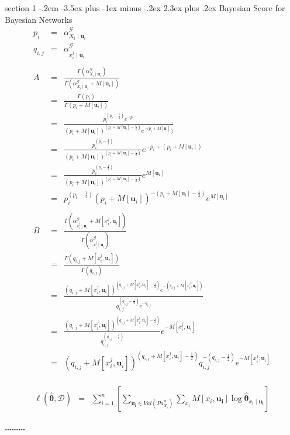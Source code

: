 \documentclass[12pt]{article}
\makeatletter
\newenvironment{problem}{\@startsection
       {section}
       {1}
       {-.2em}
       {-3.5ex plus -1ex minus -.2ex}
       {2.3ex plus .2ex}
       {\pagebreak[3]%
       \large\bf\noindent{Problem }
       }
       }
       {%
       \begin{center}\large\bf \ldots\ldots\ldots\end{center}}
\makeatother
\begin{document}
\begin{problem}{Bayesian Score for Bayesian Networks}
\begin{eqnarray*}
p_{i} & = & \alpha^{\mathcal{G}}_{X_{i}\mid \mathbf{u}_{i}}\\
q_{i,j} & = & \alpha^{\mathcal{G}}_{x_{i}^{j}\mid \mathbf{u}_{i}} \\
\\
A & = & \frac{\Gamma(\alpha^{\mathcal{G}}_{X_{i}\mid \mathbf{u}_{i}})}{\Gamma(\alpha^{\mathcal{G}}_{X_{i}\mid \mathbf{u}_{i}} + M[ \mathbf{u}_{i}])} \\
& = & \frac{\Gamma(p_{i})}{\Gamma(p_{i} + M[ \mathbf{u}_{i}])} \\
& = & \frac{p_{i}^{(p_{i}-\frac{1}{2})} e^{-p_{i}}}{(p_{i} + M[ \mathbf{u}_{i}])^{(p_{i} + M[ \mathbf{u}_{i}] - \frac{1}{2})}e^{-(p_{i} + M[ \mathbf{u}_{i}]})} \\
& = & \frac{p_{i}^{(p_{i}-\frac{1}{2})} }{(p_{i} + M[ \mathbf{u}_{i}])^{(p_{i} + M[ \mathbf{u}_{i}] - \frac{1}{2})}} e^{-p_{i}+(p_{i} + M[ \mathbf{u}_{i}])} \\
& = & \frac{p_{i}^{(p_{i}-\frac{1}{2})} }{(p_{i} + M[ \mathbf{u}_{i}])^{(p_{i} + M[ \mathbf{u}_{i}] - \frac{1}{2})}} e^{ M[ \mathbf{u}_{i}]} \\
& = & p_{i}^{(p_{i}-\frac{1}{2})} 
	(p_{i} + M[ \mathbf{u}_{i}])^{-(p_{i} + M[ \mathbf{u}_{i}] - \frac{1}{2})} 
	e^{ M[ \mathbf{u}_{i}]} \\
\\
B & = & \frac{\Gamma(\alpha^{\mathcal{G}}_{x_{i}^{j}\mid \mathbf{u}_{i}} + M[ x_{i}^{j},\mathbf{u}_{i}])}{\Gamma(\alpha^{\mathcal{G}}_{x_{i}^{j}\mid \mathbf{u}_{i}} )}\\
& = & \frac{\Gamma(q_{i,j}  + M[ x_{i}^{j},\mathbf{u}_{i}])}{\Gamma(q_{i,j} )}\\
& = & \frac{(q_{i,j}  + M[ x_{i}^{j},\mathbf{u}_{i}])^{(q_{i,j}  + M[ x_{i}^{j},\mathbf{u}_{i}] -\frac{1}{2})}e^{-(q_{i,j}  + M[ x_{i}^{j},\mathbf{u}_{i}])}}{q_{i,j} ^{(q_{i,j} -\frac{1}{2})} e^{-q_{i,j} }}\\
& = & \frac{(q_{i,j}  + M[ x_{i}^{j},\mathbf{u}_{i}])^{(q_{i,j}  + M[ x_{i}^{j},\mathbf{u}_{i}] -\frac{1}{2})}}{q_{i,j} ^{(q_{i,j} -\frac{1}{2})} } 
	e^{-M[ x_{i}^{j},\mathbf{u}_{i}]}\\
& = & (q_{i,j}  + M[ x_{i}^{j},\mathbf{u}_{i}])^{(q_{i,j}  + M[ x_{i}^{j},\mathbf{u}_{i}] -\frac{1}{2})}
	q_{i,j} ^{-(q_{i,j} -\frac{1}{2})} 
	e^{-M[ x_{i}^{j},\mathbf{u}_{i}]}\\
\end{eqnarray*}

\begin{eqnarray*}
\ell(\hat{\mathbf{\theta}},\mathcal{D}) & = & 
	\sum^{n}_{i=1} \left[ \sum_{\mathbf{u_{i}} \in Val(Pa^{\mathcal{G}}_{X_{i}})}  \sum_{x_{i}}  
	M[x_{i},\mathbf{u_{i}}] \log \hat{\mathbf{\theta}}_{x_{i} \mid \mathbf{u_{i}}} \right]
\end{eqnarray*}



\end{problem}
\end{document}
